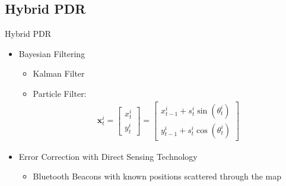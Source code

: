 \subsection{Hybrid PDR} \label{ssec:method_hybrid}
\begin{frame}{Hybrid PDR}
\begin{itemize}[<+-| alert@+>]
    \item Bayesian Filtering    
        \begin{itemize}
	      \item Kalman Filter  
          \item Particle Filter: 
          \begin{equation*}
          \begin{aligned}
          \boldsymbol{x}_{t}^{i} = 
          \begin{bmatrix}
          x_{t}^{i}\\
          y_{t}^{i} 
          \end{bmatrix}
          =
          \begin{bmatrix}
          x_{t-1}^{i} + s_{t}^{i}\sin(\theta^{i}_{t})\\
          y_{t-1}^{i} + s_{t}^{i}\cos(\theta^{i}_{t})
          \end{bmatrix}
          \end{aligned}
          \end{equation*}
        \end{itemize}
        
    \item Error Correction with Direct Sensing Technology   
        \begin{itemize}
            \item Bluetooth Beacons with known positions scattered through the map
        \end{itemize}

  	\end{itemize}

\end{frame}